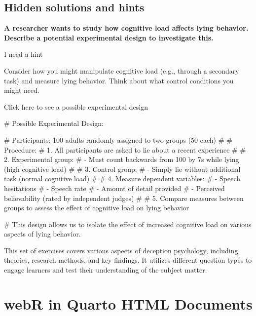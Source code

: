 \documentclass[
  letterpaper,
  DIV=11,
  numbers=noendperiod]{scrreprt}
\newenvironment{Shaded}{\begin{snugshade}}{\end{snugshade}}
\newcommand{\CommentTok}[1]{\textcolor[rgb]{0.37,0.37,0.37}{#1}}
\begin{document}
\section{Hidden solutions and hints}\label{hidden-solutions-and-hints-1}

\textbf{A researcher wants to study how cognitive load affects lying
behavior. Describe a potential experimental design to investigate this.}

I need a hint

Consider how you might manipulate cognitive load (e.g., through a
secondary task) and measure lying behavior. Think about what control
conditions you might need.

Click here to see a possible experimental design

\begin{Shaded}
\begin{Highlighting}[]
\CommentTok{\# Possible Experimental Design:}

\CommentTok{\# Participants: 100 adults randomly assigned to two groups (50 each)}
\CommentTok{\# }
\CommentTok{\# Procedure:}
\CommentTok{\# 1. All participants are asked to lie about a recent experience}
\CommentTok{\# }
\CommentTok{\# 2. Experimental group: }
\CommentTok{\#    {-} Must count backwards from 100 by 7s while lying (high cognitive load)}
\CommentTok{\# }
\CommentTok{\# 3. Control group:}
\CommentTok{\#    {-} Simply lie without additional task (normal cognitive load)}
\CommentTok{\# }
\CommentTok{\# 4. Measure dependent variables:}
\CommentTok{\#    {-} Speech hesitations}
\CommentTok{\#    {-} Speech rate}
\CommentTok{\#    {-} Amount of detail provided}
\CommentTok{\#    {-} Perceived believability (rated by independent judges)}
\CommentTok{\# }
\CommentTok{\# 5. Compare measures between groups to assess the effect of cognitive load on lying behavior}

\CommentTok{\# This design allows us to isolate the effect of increased cognitive load on various aspects of lying behavior.}
\end{Highlighting}
\end{Shaded}

This set of exercises covers various aspects of deception psychology,
including theories, research methods, and key findings. It utilizes
different question types to engage learners and test their understanding
of the subject matter.


\chapter{webR in Quarto HTML
Documents}\label{webr-in-quarto-html-documents}
\end{document}
